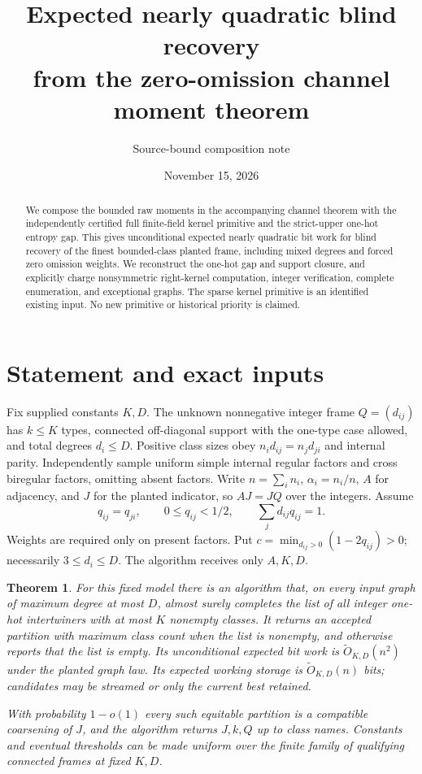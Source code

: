 \documentclass[11pt]{article}
\title{Expected nearly quadratic blind recovery\\from the zero-omission channel moment theorem}
\author{Source-bound composition note}
\date{November 15, 2026}
\newtheorem{theorem}{Theorem}
\begin{document}
\maketitle
\begin{abstract}
We compose the bounded raw moments in the accompanying channel theorem with the independently certified full finite-field kernel primitive and the strict-upper one-hot entropy gap. This gives unconditional expected nearly quadratic bit work for blind recovery of the finest bounded-class planted frame, including mixed degrees and forced zero omission weights. We reconstruct the one-hot gap and support closure, and explicitly charge nonsymmetric right-kernel computation, integer verification, complete enumeration, and exceptional graphs. The sparse kernel primitive is an identified existing input. No new primitive or historical priority is claimed.
\end{abstract}

\section{Statement and exact inputs}
Fix supplied constants $K,D$. The unknown nonnegative integer frame $Q=(d_{ij})$ has $k\le K$ types, connected off-diagonal support with the one-type case allowed, and total degrees $d_i\le D$. Positive class sizes obey $n_id_{ij}=n_jd_{ji}$ and internal parity. Independently sample uniform simple internal regular factors and cross biregular factors, omitting absent factors. Write $n=\sum_i n_i$, $\alpha_i=n_i/n$, $A$ for adjacency, and $J$ for the planted indicator, so $AJ=JQ$ over the integers. Assume
\begin{equation}\label{eq:q}
 q_{ij}=q_{ji},\qquad0\le q_{ij}<1/2,\qquad
 \sum_jd_{ij}q_{ij}=1.
\end{equation}
Weights are required only on present factors. Put $c=\min_{d_{ij}>0}(1-2q_{ij})>0$; necessarily $3\le d_i\le D$. The algorithm receives only $A,K,D$.

\begin{theorem}\label{thm:recovery}
For this fixed model there is an algorithm that, on every input graph of maximum degree at most $D$, almost surely completes the list of all integer one-hot intertwiners with at most $K$ nonempty classes. It returns an accepted partition with maximum class count when the list is nonempty, and otherwise reports that the list is empty. Its unconditional expected bit work is $\widetilde O_{K,D}(n^2)$ under the planted graph law. Its expected working storage is $\widetilde O_{K,D}(n)$ bits; candidates may be streamed or only the current best retained.

With probability $1-o(1)$ every such equitable partition is a compatible coarsening of $J$, and the algorithm returns $J,k,Q$ up to class names. Constants and eventual thresholds can be made uniform over the finite family of qualifying connected frames at fixed $K,D$.
\end{theorem}
\end{document}
